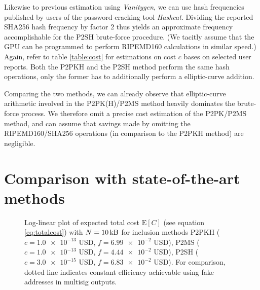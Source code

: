 \documentclass[a4paper,11pt,titlepage]{scrbook}
\begin{document}
Likewise to previous estimation using \emph{Vanitygen}, we can use hash frequencies published by users of the password cracking tool \emph{Hashcat}.
Dividing the reported SHA256 hash frequency by factor 2 thus yields an approximate frequency accomplishable for the P2SH brute-force procedure.
(We tacitly assume that the GPU can be programmed to perform RIPEMD160 calculations in similar speed.)
Again, refer to table \ref{table:cost} for estimations on cost $c$ bases on selected user reports.
Both the P2PKH and the P2SH method perform the same hash operations, only the former has to additionally perform a elliptic-curve addition.

Comparing the two methods, we can already observe that elliptic-curve arithmetic involved in the P2PK(H)/P2MS method heavily dominates the brute-force process.
We therefore omit a precise cost estimation of the P2PK/P2MS method, and can assume that savings made by omitting the RIPEMD160/SHA256 operations (in comparison to the P2PKH method) are negligible.

\section{Comparison with state-of-the-art methods}

\begin{figure}[tb]
    \centering
    \caption[Log-linear plot of expected total cost]{Log-linear plot of expected total cost $\mathrm{E}[C]$ (see equation \ref{eq:totalcost}) with $N=\protect\SI{10}{\kilo\byte}$ for inclusion methods P2PKH ($c=\num{1.0e-13}$ USD, $f=\num{6.99e-2}$ USD), P2MS ($c=\num{1.0e-13}$ USD, $f=\num{4.44e-2}$ USD), P2SH ($c=\num{3.0e-15}$ USD, $f=\num{6.83e-2}$ USD). For comparison, dotted line indicates constant efficiency achievable using fake addresses in multisig outputs.}
\end{figure}
\end{document}
